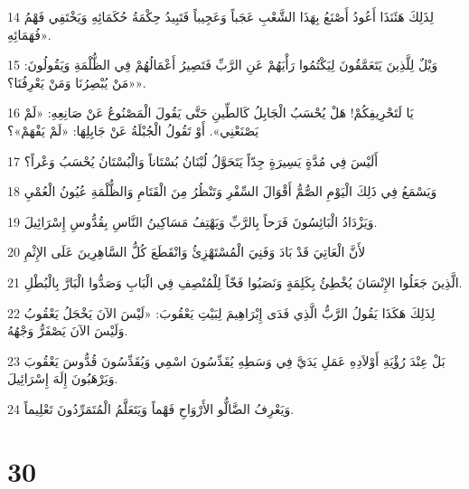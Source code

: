 \par 14 لِذَلِكَ هَئَنَذَا أَعُودُ أَصْنَعُ بِهَذَا الشَّعْبِ عَجَباً وَعَجِيباً فَتَبِيدُ حِكْمَةُ حُكَمَائِهِ وَيَخْتَفِي فَهْمُ فُهَمَائِهِ».
\par 15 وَيْلٌ لِلَّذِينَ يَتَعَمَّقُونَ لِيَكْتُمُوا رَأْيَهُمْ عَنِ الرَّبِّ فَتَصِيرُ أَعْمَالُهُمْ فِي الظُّلْمَةِ وَيَقُولُونَ: «مَنْ يُبْصِرُنَا وَمَنْ يَعْرِفُنَا؟».
\par 16 يَا لَتَحْرِيفِكُمْ! هَلْ يُحْسَبُ الْجَابِلُ كَالطِّينِ حَتَّى يَقُولَ الْمَصْنُوعُ عَنْ صَانِعِهِ: «لَمْ يَصْنَعْنِي». أَوْ تَقُولُ الْجُبْلَةُ عَنْ جَابِلِهَا: «لَمْ يَفْهَمْ»؟
\par 17 أَلَيْسَ فِي مُدَّةٍ يَسِيرَةٍ جِدّاً يَتَحَوَّلُ لُبْنَانُ بُسْتَاناً وَالْبُسْتَانُ يُحْسَبُ وَعْراً؟
\par 18 وَيَسْمَعُ فِي ذَلِكَ الْيَوْمِ الصُّمُّ أَقْوَالَ السِّفْرِ وَتَنْظُرُ مِنَ الْقَتَامِ وَالظُّلْمَةِ عُيُونُ الْعُمْيِ
\par 19 وَيَزْدَادُ الْبَائِسُونَ فَرَحاً بِالرَّبِّ وَيَهْتِفُ مَسَاكِينُ النَّاسِ بِقُدُّوسِ إِسْرَائِيلَ.
\par 20 لأَنَّ الْعَاتِيَ قَدْ بَادَ وَفَنِيَ الْمُسْتَهْزِئُ وَانْقَطَعَ كُلُّ السَّاهِرِينَ عَلَى الإِثْمِ
\par 21 الَّذِينَ جَعَلُوا الإِنْسَانَ يُخْطِئُ بِكَلِمَةٍ وَنَصَبُوا فَخّاً لِلْمُنْصِفِ فِي الْبَابِ وَصَدُّوا الْبَارَّ بِالْبُطْلِ.
\par 22 لِذَلِكَ هَكَذَا يَقُولُ الرَّبُّ الَّذِي فَدَى إِبْرَاهِيمَ لِبَيْتِ يَعْقُوبَ: «لَيْسَ الآنَ يَخْجَلُ يَعْقُوبُ وَلَيْسَ الآنَ يَصْفَرُّ وَجْهُهُ.
\par 23 بَلْ عِنْدَ رُؤْيَةِ أَوْلاَدِهِ عَمَلِ يَدَيَّ فِي وَسَطِهِ يُقَدِّسُونَ اسْمِي وَيُقَدِّسُونَ قُدُّوسَ يَعْقُوبَ وَيَرْهَبُونَ إِلَهَ إِسْرَائِيلَ.
\par 24 وَيَعْرِفُ الضَّالُّو الأَرْوَاحِ فَهْماً وَيَتَعَلَّمُ الْمُتَمَرِّدُونَ تَعْلِيماً.

\chapter{30}

